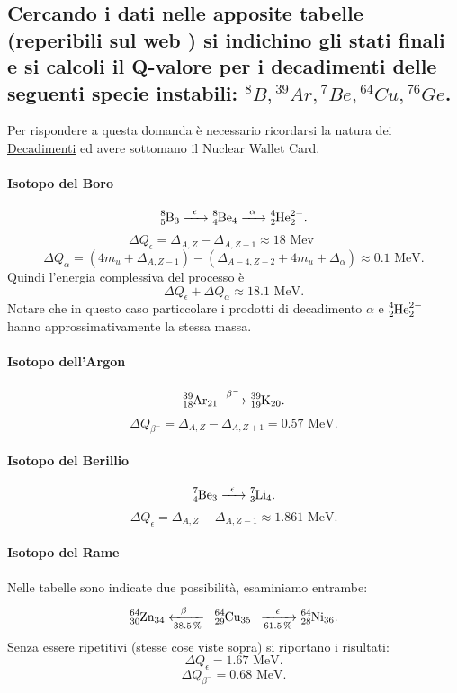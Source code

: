 \subsection[]{Cercando i dati nelle apposite tabelle (reperibili sul web ) si indichino gli stati finali e si calcoli il Q-valore per i decadimenti delle seguenti specie instabili: ${}^8B, {}^{39}Ar, {}^{7}Be, {}^{64}Cu, {}^{76}Ge$. }
Per rispondere a questa domanda è necessario ricordarsi la natura dei \hyperref[sec:decadimenti]{Decadimenti} ed avere sottomano il Nuclear Wallet Card.
\paragraph{Isotopo del Boro}
\label{par:8B}
\[
	\ce{\ce{^{8}_{5}B_{3}} ->[\epsilon] \ce{^{8}_{4}\text{Be}_{4}} ->[\alpha] \ce{^{4}_{2}\text{He}^{2-}_{2}} } 
.\]
\[
	\Delta Q_{\epsilon} = \Delta_{A, Z} - \Delta_{A, Z-1} \approx 18 \text{ Mev} \quad \quad  
\]
\[
	\Delta Q_{\alpha} = ( 4m_u +  \Delta_{A,Z-1}) - \left( \Delta_{A-4, Z-2} + 4m_u + \Delta _{\alpha} \right) \approx 0.1 \text{ MeV}
.\] 
Quindi l'energia complessiva del processo è 
\[
	\Delta Q_{\epsilon}+ \Delta Q_{\alpha} \approx 18.1 \text{ MeV}.
\]
Notare che in questo caso particcolare i prodotti di decadimento $\alpha$ e $\ce{^{4}_{2}\text{He}^{2-}_{2}}$ hanno approssimativamente la stessa massa.
\paragraph{Isotopo dell'Argon}
\label{par:39Ar}
\[
	\ce{\ce{^{39}_{18}\text{Ar}_{21}}  ->[\beta^-] \ce{^{39}_{19}K_{20}}}
.\] 
\[
	\Delta Q_{\beta^-} = \Delta_{A,Z} - \Delta_{A, Z+1} = 0.57 \text{ MeV} 
.\] 
\paragraph{Isotopo del Berillio}%
\label{par:7Be}
\[
	\ce{\ce{^{7}_{4}\text{Be}_{3}} ->[\epsilon] \ce{^{7}_{3}\text{Li}_{4}} }
.\] 
\[
\Delta Q_{\epsilon} = \Delta_{A, Z} - \Delta_{A, Z-1} \approx 1.861 \text{ MeV}
.\] 
\paragraph{Isotopo del Rame}%
\label{par:64Cu}
Nelle tabelle sono indicate due possibilità, esaminiamo entrambe:
\[
	\ce{ \ce{^{64}_{30}\text{Zn}_{34}} <-[\beta^-][38.5 \%] \text{ } \ce{^{64}_{29}\text{Cu}_{35}} \text{ } ->[\epsilon][61.5\%] \ce{^{64}_{28}\text{Ni}_{36}} }
.\] 
Senza essere ripetitivi (stesse cose viste sopra) si riportano i risultati:
\[
\Delta Q_{\epsilon} = 1.67 \text{ MeV}
.\] 
\[
\Delta Q_{\beta^-} = 0.68 \text{ MeV}
.\] 

